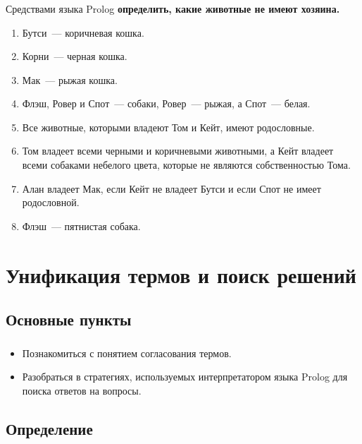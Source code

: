 \begin{frame}
	\frametitle{\insertsection}
	\framesubtitle{\insertsubsection}
	Средствами языка Prolog \textbf{определить, какие животные не имеют хозяина.}
	\begin{enumerate}
		\item Бутси~--- коричневая кошка.
		\item Корни~--- черная кошка.
		\item Мак~--- рыжая кошка.
		\item Флэш, Ровер и Спот~--- собаки, Ровер~--- рыжая, а Спот~--- белая.
		\item Все животные, которыми владеют Том и Кейт, имеют родословные.
		\item Том владеет всеми черными и коричневыми животными, а Кейт владеет всеми собаками небелого цвета, которые не являются собственностью Тома.
		\item Алан владеет Мак, если Кейт не владеет Бутси и если Спот не имеет родословной.
		\item Флэш~--- пятнистая собака.
	\end{enumerate}
\end{frame}


\section{Унификация термов и поиск решений}
\subsection{Основные пункты}

\begin{frame}
	\frametitle{\insertsection}
	\framesubtitle{\insertsubsection}
	\begin{itemize}
		\item Познакомиться с понятием согласования термов.
		\item Разобраться в стратегиях, используемых интерпретатором языка Prolog для поиска ответов на вопросы.
	\end{itemize}
\end{frame}

\subsection{Определение}

